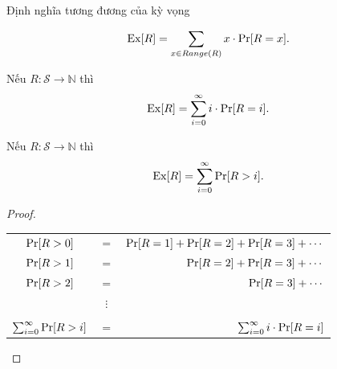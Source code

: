 \begin{frame}{Định nghĩa tương đương của kỳ vọng}
	\begin{thrm}
		$$\mathrm{Ex}[R] = \sum_{x \in Range(R)} x \cdot \mathrm{Pr}[R = x].$$
	\end{thrm}
	\vspace{-0.5cm}
	
\end{frame}

\begin{frame}
	\begin{crllr}
		Nếu $R: \mathcal{S} \longrightarrow \mathbb{N}$ thì
		\[
			\mathrm{Ex}[R] = \sum_{i=0}^{\infty} i\cdot \mathrm{Pr}[R=i]. 
		\]
	\end{crllr}
\end{frame}

\begin{frame}
	\begin{thrm}
		Nếu $R: \mathcal{S} \longrightarrow \mathbb{N}$ thì
		\[
			\mathrm{Ex}[R] = \sum_{i=0}^{\infty} \mathrm{Pr}[R>i]. 
		\]		
	\end{thrm}
	\begin{proof}
	\begin{tabular}{ccr}
	$\mathrm{Pr}[R>0]$ &$=$ &$\mathrm{Pr}[R=1] + \mathrm{Pr}[R=2] + \mathrm{Pr}[R=3] + \cdots$ \\
	$\mathrm{Pr}[R>1]$ &$=$ &           $\mathrm{Pr}[R=2] + \mathrm{Pr}[R=3] + \cdots$ \\
	$\mathrm{Pr}[R>2]$ &$=$ &                      $\mathrm{Pr}[R=3] + \cdots$ \\
	           &$\vdots$ &  \\
	\hline\\
	$\sum_{i=0}^{\infty} \mathrm{Pr}[R>i]$ &$=$ &$\sum_{i=0}^{\infty} i\cdot\pr[R=i]\hfill\hfill$
	\end{tabular}	
		
	\end{proof}
\end{frame}

